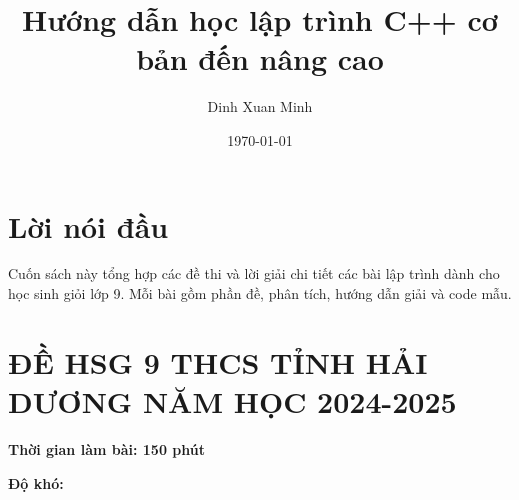\documentclass[12pt]{scrartcl}  %
\title{Hướng dẫn học lập trình C++ cơ bản đến nâng cao}
\author{Dinh Xuan Minh}
\date{\today}
\begin{document}
\maketitle
\tableofcontents

\section*{Lời nói đầu}
Cuốn sách này tổng hợp các đề thi và lời giải chi tiết các bài lập trình dành cho học sinh giỏi lớp 9. Mỗi bài gồm phần đề, phân tích, hướng dẫn giải và code mẫu.

\section{ĐỀ HSG 9 THCS TỈNH HẢI DƯƠNG NĂM HỌC 2024-2025}
\textbf{Thời gian làm bài: 150 phút}

\textbf{Độ khó: }
\end{document}
